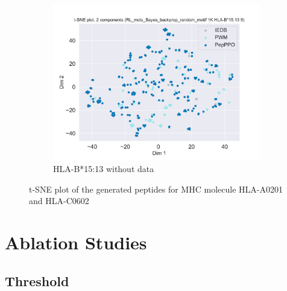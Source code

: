 \documentclass[letterpaper]{article}
\begin{document}
\begin{figure}[!t]
\begin{subfigure}[b]{.48\linewidth}
    \end{subfigure}
    ~~
    \begin{subfigure}[b]{.48\linewidth}
    	\centering
    	\includegraphics[width=\linewidth]{plots/HLA-B1513_RL_mcts_Bayes_backprop_random_motif_1K_9.pdf}
    	\caption{HLA-B*15:13 without data}
    	\label{fig:case:hla-b1513}
    \end{subfigure}
	\caption{t-SNE plot of the generated peptides for MHC molecule HLA-A0201 and HLA-C0602}
	\label{fig:tsne}
\end{figure}

\section{Ablation Studies}
\label{sec:study}

\subsection{Threshold}
\label{sec:dis:policy}




\end{document}
